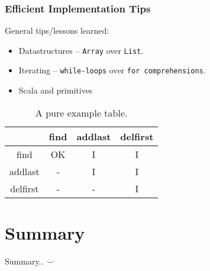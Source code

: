 \documentclass[a4paper,english]{report}
\begin{document}
\subsection{Efficient Implementation Tips}

General tips/lessons learned:

\begin{itemize}
  \item Datastructures -- \texttt{Array} over \texttt{List}.
  \item Iterating -- \texttt{while-loops} over \texttt{for comprehensions}.
  \item Scala and primitives
\end{itemize}

\begin{table}[ht]
  \centering
  \begin{tabular}{c c c c}
    \hline\hline
    & find & addlast & delfirst \\ [0.5ex]
    \hline\hline
    find & OK & I & I \\
    addlast & - & I & I \\
    delfirst & - & - & I \\
    \hline\hline
  \end{tabular}
  \caption{A pure example table.\label{tab:ex1}}
\end{table}

\chapter{Summary}

Summary.. $\ddot\smile$



\end{document}
